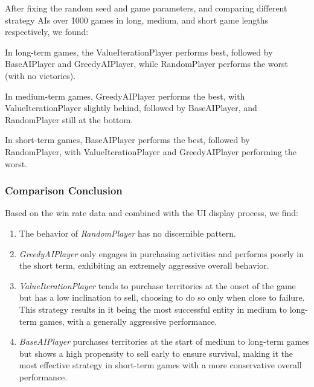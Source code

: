 \documentclass{article}
\begin{document}
    After fixing the random seed and game parameters, and comparing different strategy AIs over 1000 games in long, medium, and short game lengths respectively, we found:

    In long-term games, the ValueIterationPlayer performs best, followed by BaseAIPlayer and GreedyAIPlayer, while RandomPlayer performs the worst (with no victories).
    
    In medium-term games, GreedyAIPlayer performs the best, with ValueIterationPlayer slightly behind, followed by BaseAIPlayer, and RandomPlayer still at the bottom.
    
    In short-term games, BaseAIPlayer performs the best, followed by RandomPlayer, with ValueIterationPlayer and GreedyAIPlayer performing the worst.

    \subsubsection{Comparison Conclusion}
    Based on the win rate data and combined with the UI display process, we find:
    \begin{enumerate}
        \item The behavior of \textit{RandomPlayer} has no discernible pattern.
        \item \textit{GreedyAIPlayer} only engages in purchasing activities and performs poorly in the short term, exhibiting an extremely aggressive overall behavior.
        \item \textit{ValueIterationPlayer} tends to purchase territories at the onset of the game but has a low inclination to sell, choosing to do so only when close to failure. This strategy results in it being the most successful entity in medium to long-term games, with a generally aggressive performance.
        \item \textit{BaseAIPlayer} purchases territories at the start of medium to long-term games but shows a high propensity to sell early to ensure survival, making it the most effective strategy in short-term games with a more conservative overall performance.
    \end{enumerate}
    
\end{document}
